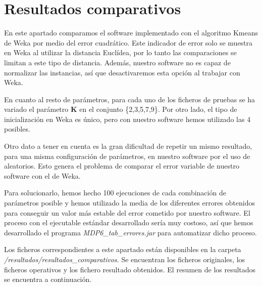 \documentclass[a4paper]{report}
\begin{document}
	\section{Resultados comparativos}
	\label{rescomparativos}
	En este apartado comparamos el software implementado con el algoritmo Kmeans de Weka por medio del error cuadrático. Este indicador de error solo se muestra en Weka al utilizar la distancia Euclídea, por lo tanto las comparaciones se limitan a este tipo de distancia. Además, nuestro software no es capaz de normalizar las instancias, así que desactivaremos esta opción al trabajar con Weka.
	
	En cuanto al resto de parámetros, para cada uno de los ficheros de pruebas se ha variado el parámetro \textbf{K} en el conjunto \{2,3,5,7,9\}. Por otro lado, el tipo de inicialización en Weka es único, pero con nuestro software hemos utilizado las 4 posibles.
	
	Otro dato a tener en cuenta es la gran dificultad de repetir un mismo resultado, para una misma configuración de parámetros, en nuestro software por el uso de aleatorios. Esto genera el problema de comparar el error variable de nuestro software con el de Weka.
	
	Para solucionarlo, hemos hecho 100 ejecuciones de cada combinación de parámetros posible y hemos utilizado la media de los diferentes errores obtenidos para conseguir un valor más estable del error cometido por nuestro software. El proceso con el ejecutable estándar desarrollado sería muy costoso, así que hemos desarrollado el programa \textit{MDP6\_tab\_errores.jar} para automatizar dicho proceso.
	
	Los ficheros correspondientes a este apartado están disponibles en la carpeta \textit{/resultados/resultados\_comparativos}. Se encuentran los ficheros originales, los ficheros operativos y los fichero resultado obtenidos. El resumen de los resultados se encuentra a continuación.
	
\end{document}

